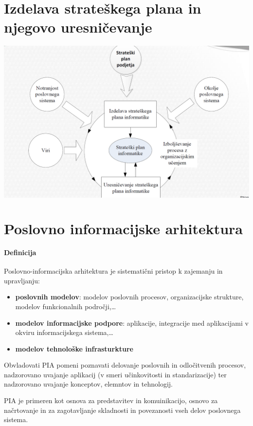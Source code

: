 \documentclass[a4paper,12pt]{report}
\begin{document}
   \section{Izdelava strateškega plana in njegovo uresničevanje}
      \includegraphics[scale=0.375]{003.png}

   \section{Poslovno informacijske arhitektura}
      \paragraph{Definicija} Poslovno-informacijska arhitektura je sistematični pristop k zajemanju in upravljanju:
         \begin{itemize}
            \item \textbf{poslovnih modelov}: modelov poslovnih procesov, organizacijske strukture, modelov funkcionalnih področji,\dots
            \item \textbf{modelov informacijske podpore}: aplikacije, integracije med aplikacijami v okviru informacijskega sistema,\dots
            \item \textbf{modelov tehnološke infrasturkture}
         \end{itemize}

      Obvladovati PIA pomeni poznavati delovanje poslovnih in odločitvenih procesov, nadzorovano uvajanje aplikacij (v smeri učinkovitosti in standarizacije) ter nadzorovano uvajanje konceptov, elemntov in tehnologij.

      PIA je primeren kot osnova za predstavitev in komuinikacijo, osnovo za načrtovanje in za zagotavljanje skladnosti in povezanosti vseh delov poslovnega sistema.
\end{document}
